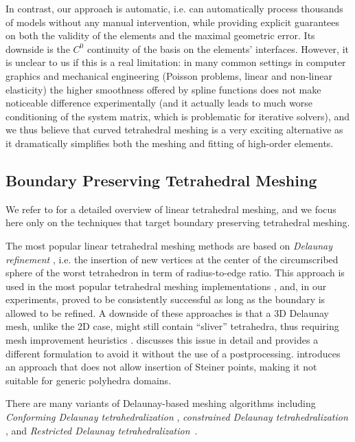 In contrast, our approach is automatic, i.e. can automatically process thousands of models without any manual intervention, while providing explicit guarantees on both the validity of the elements and the maximal geometric error. Its downside is the $C^0$ continuity of the basis on the elements' interfaces. However, it is unclear to us if this is a real limitation: in many common settings in computer graphics and mechanical engineering (Poisson problems, linear and non-linear elasticity) the higher smoothness offered by spline functions does not make noticeable difference experimentally \cite{schneider2019large} (and it actually leads to much worse conditioning of the system matrix, which is problematic for iterative solvers), and we thus believe that curved tetrahedral meshing is a very exciting alternative as it dramatically simplifies both the meshing and fitting of high-order elements.

\subsection{Boundary Preserving Tetrahedral Meshing}
\label{cumin:sec:rel:linear}

We refer to \cite{hu2018tetrahedral} for a detailed overview of linear tetrahedral meshing, and we focus here only on the techniques that target boundary preserving tetrahedral meshing. 

The most popular linear tetrahedral meshing methods are based on {\em Delaunay refinement}
\cite{chew1993guaranteed,shewchuk1998tetrahedral,ruppert1995delaunay}, i.e. the insertion of new vertices at the center of the circumscribed sphere of the worst
tetrahedron in term of radius-to-edge ratio. This approach is used in the most popular tetrahedral meshing implementations  \cite{tetgen,jamin2015cgalmesh}, and, in
our experiments, proved to be consistently successful as long as the boundary is allowed to be refined. A downside of these approaches is that a 3D Delaunay mesh, unlike the 2D case, might still contain ``sliver'' tetrahedra, thus requiring mesh improvement
heuristics \cite{cheng2000silver,du2003tetrahedral,alliez2005variational,tournois2009interleaving}. \cite{Alexa:2019} discusses this issue in detail and provides a different formulation to avoid it without the use of a postprocessing. 
%
\cite{alexa2020conforming} introduces an approach that does not allow insertion of Steiner points, making it not suitable for generic polyhedra domains.

There are many variants of {Delaunay-based} meshing algorithms including 
{\em Conforming Delaunay tetrahedralization}
\cite{murphy2001point,CohenSteiner:2002:CDT}, {\em constrained Delaunay tetrahedralization}
\cite{chew1989constrained,si2005meshing,shewchuk2002constrained,SiS14}, and {\em Restricted Delaunay tetrahedralization}\ \cite{cheng2008practical,boissonnat2005provably,Engwirda16}.

